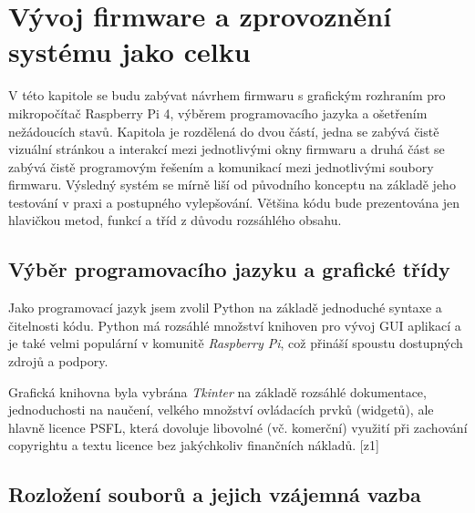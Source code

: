%
%


\chapter{Vývoj firmware a zprovoznění systému jako celku}

V této kapitole se budu zabývat návrhem firmwaru s grafickým rozhraním pro mikropočítač Raspberry Pi 4, výběrem programovacího jazyka a ošetřením nežádoucích
stavů. Kapitola je rozdělená do dvou částí, jedna se zabývá čistě vizuální stránkou a interakcí mezi jednotlivými okny firmwaru a druhá část se zabývá čistě programovým řešením a komunikací mezi jednotlivými soubory firmwaru. Výsledný systém se mírně liší od původního konceptu na základě jeho testování v praxi a postupného vylepšování.
Většina kódu bude prezentována jen hlavičkou metod, funkcí a tříd z důvodu rozsáhlého obsahu.

\section{Výběr programovacího jazyku a grafické třídy}
Jako programovací jazyk jsem zvolil Python na základě jednoduché syntaxe a čitelnosti kódu. Python má rozsáhlé množství knihoven pro vývoj GUI aplikací a je také velmi populární v komunitě \textit{Raspberry Pi}, což přináší spoustu dostupných zdrojů a podpory.

Grafická knihovna byla vybrána \textit{Tkinter} na základě rozsáhlé dokumentace, jednoduchosti na naučení, velkého množství ovládacích prvků (widgetů), ale hlavně licence PSFL, která dovoluje libovolné (vč. komerční) využití při zachování copyrightu a textu licence bez jakýchkoliv finančních nákladů. [z1]

\section{Rozložení souborů a jejich vzájemná vazba}

